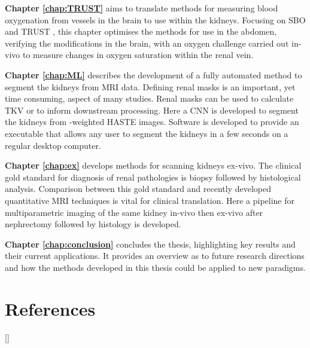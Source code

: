 \textbf{Chapter \ref{chap:TRUST}} aims to translate methods for measuring blood oxygenation from vessels in the brain to use within the kidneys. Focusing on \ac{SBO} \cite{jain_mri_2010} and \ac{TRUST} \cite{lu_quantitative_2008}, this chapter optimises the methods for use in the abdomen, verifying the modifications in the brain, with an oxygen challenge carried out in-vivo to measure changes in oxygen saturation within the renal vein.

\textbf{Chapter \ref{chap:ML}} describes the development of a fully automated method to segment the kidneys from \ac{MRI} data. Defining renal masks is an important, yet time consuming, aspect of many studies. Renal masks can be used to calculate \ac{TKV} or to inform downstream processing. Here a \ac{CNN} is developed to segment the kidneys from \ttwo-weighted \ac{HASTE} images. Software is developed to provide an executable that allows any user to segment the kidneys in a few seconds on a regular desktop computer.

\textbf{Chapter \ref{chap:ex}} develops methods for scanning kidneys ex-vivo. The clinical gold standard for diagnosis of renal pathologies is biopsy followed by histological analysis. Comparison between this gold standard and recently developed quantitative \ac{MRI} techniques is vital for clinical translation. Here a pipeline for multiparametric imaging of the same kidney in-vivo then ex-vivo after nephrectomy followed by histology is developed.

\textbf{Chapter \ref{chap:conclusion}} concludes the thesis, highlighting key results and their current applications. It provides an overview as to future research directions and how the methods developed in this thesis could be applied to new paradigms.

\newpage
\section{References}
[\refname]{}
\printbibliography